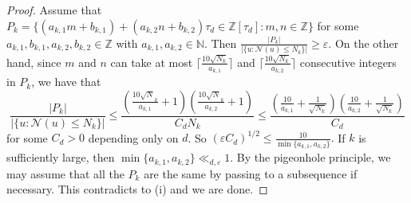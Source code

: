 \documentclass[11pt]{amsart}
\theoremstyle{definition}
\DeclareMathOperator*{\E}{\mathbb{E}}
\newcommand{\N}{{\mathbb N}}
\newcommand{\NN}{{\mathcal N}}
\newcommand{\Z}{{\mathbb Z}}
\newcommand{\FM}[1]{{\color{violet}{{#1}}}}
\begin{document}
\begin{proof}
 Assume that $P_{k}=
\{(a_{k,1}m+b_{k,1})+(a_{k,2}n+b_{k,2})\tau_{d}\in \Z[\tau_{d}]\colon m,n\in\Z\}$
        for some $a_{k,1},b_{k,1},a_{k,2},b_{k,2}\in\Z$ with $a_{k,1},a_{k,2}\in\N$. Then $\frac{\vert P_{k}\vert}{\vert \{u\colon \NN(u)\leq N_{k}\}\vert}\geq \varepsilon$. On the other hand, since $m$ and $n$ can take at most $\lceil\frac{10\sqrt{N_{k}}}{a_{k,1}}\rceil$ and $\lceil\frac{10\sqrt{N_{k}}}{a_{k,2}}\rceil$ consecutive integers in $P_{k}$, we have that
        $$\frac{\vert P_{k}\vert}{\vert \{u\colon \NN(u)\leq N_{k}\}\vert}\leq \frac{(\frac{10\sqrt{N}_{k}}{a_{k,1}}+1)(\frac{10\sqrt{N}_{k}}{a_{k,2}}+1)}{C_{d}N_{k}}\leq \frac{(\frac{10}{a_{k,1}}+\frac{1}{\sqrt{N_{k}}})(\frac{10}{a_{k,2}}+\frac{1}{\sqrt{N_{k}}})}{C_{d}}$$
        for some $C_{d}>0$ depending only on $d$. So 
        $(\varepsilon C_{d})^{1/2}\leq \frac{10}{\min\{a_{k,1},a_{k,2}\}}.$
If $k$ is sufficiently large, then $\min\{a_{k,1},a_{k,2}\}\ll_{d, \varepsilon} 1$.
By the pigeonhole principle, we may assume that all the $P_{k}$ are the same by passing to a subsequence if necessary. This contradicts to (i) and we are done.      
\end{proof}
\end{document}

